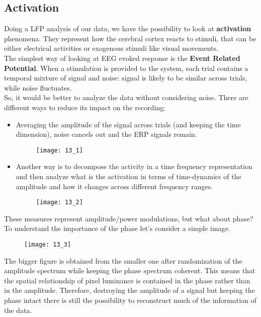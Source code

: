 \subsection{Activation}
Doing a LFP analysis of our data, we have the possibility to look at \textbf{activation} phenomena. 
They represent how the cerebral cortex reacts to stimuli, that can be either electrical activities or exogenous stimuli like visual movements.\\
The simplest way of looking at EEG evoked response is the \textbf{Event Related Potential}.
When a stimulation is provided to the system, each trial contains a temporal mixture of signal and noise: signal is likely to be similar across trials, while noise fluctuates.\\
So, it would be better to analyze the data without considering noise. There are different ways to reduce its impact on the recording:
\begin{itemize}
    \item Averaging the amplitude of the signal across trials (and keeping the time dimension), noise cancels out and the ERP signals remain.
    \begin{figure}[H]
        \centering
        \texttt{[image: 13\_1]}
    \end{figure}
    \item Another way is to decompose the activity in a time frequency representation and then analyze what is the activation in terms of time-dynamics of the amplitude and how it changes across different frequency ranges.
    \begin{figure}[H]
        \centering
        \texttt{[image: 13\_2]}
    \end{figure}
\end{itemize}
These measures represent amplitude/power modulations, but what about phase? To understand the importance of the phase let's consider a simple image. 
\begin{figure}[H]
    \centering
    \texttt{[image: 13\_3]}
\end{figure}
The bigger figure is obtained from the smaller one after randomization of the amplitude spectrum while keeping the phase spectrum coherent.
This means that the spatial relationship of pixel luminance is contained in the phase rather than in the amplitude. 
Therefore, destroying the amplitude of a signal but keeping the phase intact there is still the possibility to reconstruct much of the information of the data.\\
